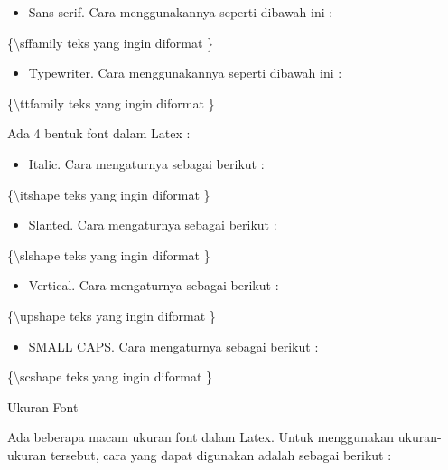 \begin{itemize}
\item Sans serif. Cara menggunakannya seperti dibawah ini :
\end{itemize}
\hspace{0,5in}\{$\setminus$sffamily teks yang ingin diformat \}

\begin{itemize}
\item Typewriter. Cara menggunakannya seperti dibawah ini :
\end{itemize}
\hspace{0,5in}\{$\setminus$ttfamily teks yang ingin diformat \}\par \vspace{12pt}



Ada 4 bentuk font dalam Latex :

\begin{itemize}
\item Italic. Cara mengaturnya sebagai berikut :
\end{itemize}
\hspace{0,5in}\{$\setminus$itshape teks yang ingin diformat \}

\begin{itemize}
\item Slanted. Cara mengaturnya sebagai berikut :
\end{itemize}
\hspace{0,5in}\{$\setminus$slshape teks yang ingin diformat \}

\begin{itemize}
\item Vertical. Cara mengaturnya sebagai berikut :
\end{itemize}
\hspace{0,5in}\{$\setminus$upshape teks yang ingin diformat \}

\begin{itemize}
\item SMALL CAPS. Cara mengaturnya sebagai berikut :
\end{itemize}
\hspace{0,5in}\{$\setminus$scshape teks yang ingin diformat \}
\par \vspace{12pt}


Ukuran Font

Ada beberapa macam ukuran font dalam Latex. Untuk menggunakan 
ukuran-ukuran tersebut, cara yang dapat digunakan adalah sebagai berikut :

